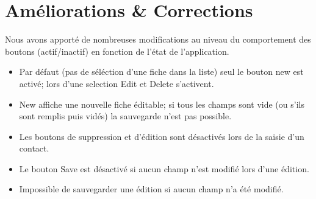 \documentclass{article}
\begin{document}
\section{Améliorations \& Corrections}
Nous avons apporté de nombreuses modifications au niveau du comportement des boutons (actif/inactif) en fonction de l'état de l'application.
\begin{itemize}
\item Par défaut (pas de séléction d'une fiche dans la liste) seul le bouton new est activé; lors d'une selection Edit et Delete s'activent.
\item New affiche une nouvelle fiche éditable; si tous les champs sont vide (ou s'ils sont remplis puis vidés) la sauvegarde n'est pas possible. 
\item Les boutons de suppression et d'édition sont désactivés lors de la saisie d'un contact.
\item Le bouton Save est désactivé si aucun champ n'est modifié lors d'une édition.
\item Impossible de sauvegarder une édition si aucun champ n'a été modifié.
\end{itemize}
\newpage
\end{document}
